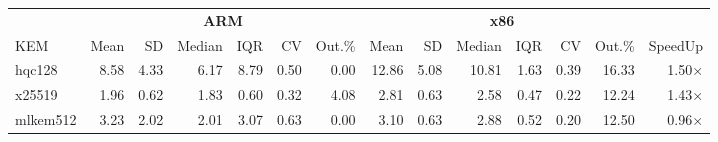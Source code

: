 \begin{table}[!ht]
\centering
\begin{tabular}{l|rrrrrr|rrrrrr|r}
\toprule
& \multicolumn{6}{c}{\bfseries ARM} & \multicolumn{6}{c}{\bfseries x86} & \\
\cmidrule(lr){2-7} \cmidrule(lr){8-13}
KEM & Mean & SD & Median & IQR & CV & Out.\% & Mean & SD & Median & IQR & CV & Out.\% & SpeedUp \\
\midrule
hqc128 & 8.58 & 4.33 & 6.17 & 8.79 & 0.50 & 0.00 & 12.86 & 5.08 & 10.81 & 1.63 & 0.39 & 16.33 & 1.50× \\
x25519 & 1.96 & 0.62 & 1.83 & 0.60 & 0.32 & 4.08 & 2.81 & 0.63 & 2.58 & 0.47 & 0.22 & 12.24 & 1.43× \\
mlkem512 & 3.23 & 2.02 & 2.01 & 3.07 & 0.63 & 0.00 & 3.10 & 0.63 & 2.88 & 0.52 & 0.20 & 12.50 & 0.96× \\
\bottomrule
\end{tabular}
\end{table}
